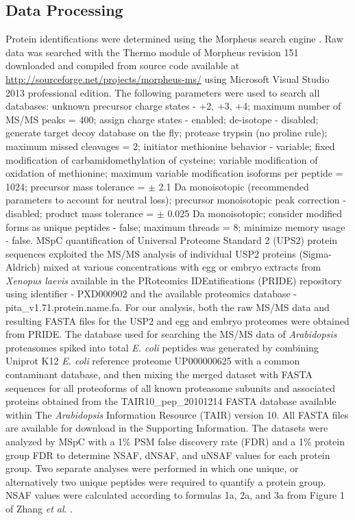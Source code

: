 \subsection{Data Processing}

Protein identifications were determined using the Morpheus search engine \citep{wenger13}.  Raw data was searched with the Thermo module of Morpheus revision 151 downloaded and compiled from source code available at \url{http://sourceforge.net/projects/morpheus-ms/} using Microsoft Visual Studio 2013 professional edition.  The following parameters were used to search all databases: unknown precursor charge states - +2, +3, +4; maximum number of MS/MS peaks = 400; assign charge states - enabled; de-isotope - disabled; generate target decoy database on the fly; protease trypsin (no proline rule); maximum missed cleavages = 2; initiator methionine behavior - variable; fixed modification of carbamidomethylation of cysteine; variable modification of oxidation of methionine; maximum variable modification isoforms per peptide = 1024; precursor mass tolerance = $\pm$ 2.1 Da monoisotopic (recommended parameters to account for neutral loss); precursor monoisotopic peak correction - disabled; product mass tolerance = $\pm$ 0.025 Da monoisotopic; consider modified forms as unique peptides - false; maximum threads = 8; minimize memory usage - false.   
MSpC quantification of Universal Proteome Standard 2 (UPS2) protein sequences exploited the MS/MS analysis of individual USP2 proteins (Sigma-Aldrich) mixed at various concentrations with egg or embryo extracts from \textit{Xenopus laevis} available in the PRoteomics IDEntifications (PRIDE) repository \citep{vizcaino13} using identifier - PXD000902 and the available proteomics database - pita\_v1.71.protein.name.fa.  For our analysis, both the raw MS/MS data and resulting FASTA files for the USP2 and egg and embryo proteomes were obtained from PRIDE.  The database used for searching the MS/MS data of \textit{Arabidopsis} proteasomes spiked into total \textit{E. coli} peptides was generated by combining Uniprot K12 \textit{E. coli} reference proteome UP000000625 with a common contaminant database, and then mixing the merged dataset with FASTA sequences for all proteoforms of all known proteasome subunits and associated proteins \citep{book10} obtained from the TAIR10\_pep\_20101214 FASTA database available within The \textit{Arabidopsis} Information Resource (TAIR) version 10.  All FASTA files are available for download in the Supporting Information.  The datasets were analyzed by MSpC with a 1\% PSM false discovery rate (FDR) and a 1\% protein group FDR to determine NSAF, dNSAF, and uNSAF values for each protein group. Two separate analyses were performed in which one unique, or alternatively two unique peptides were required to quantify a protein group.  NSAF values were calculated according to formulas 1a, 2a, and 3a from Figure 1 of Zhang \textit{et al}. \citep{zhang10}.

